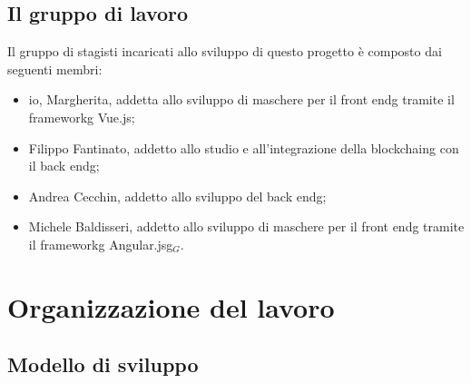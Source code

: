 \subsection{Il gruppo di lavoro}

Il gruppo di stagisti incaricati allo sviluppo di questo progetto è composto dai seguenti membri:
\begin{itemize}
	\item io, Margherita, addetta allo sviluppo di maschere per il \gls{front endg} tramite il \gls{frameworkg} Vue.js;
	\item Filippo Fantinato, addetto allo studio e all'integrazione della \gls{blockchaing} con il \gls{back endg};
	\item Andrea Cecchin, addetto allo sviluppo del \gls{back endg};
	\item Michele Baldisseri, addetto allo sviluppo di maschere per il \gls{front endg} tramite il \gls{frameworkg} \gls{Angular.jsg}$_G$.
\end{itemize}

\section{Organizzazione del lavoro}
\label{sec:organizzazione-lavoro}

\subsection{Modello di sviluppo}
\label{subsec:modello-sviluppo}

